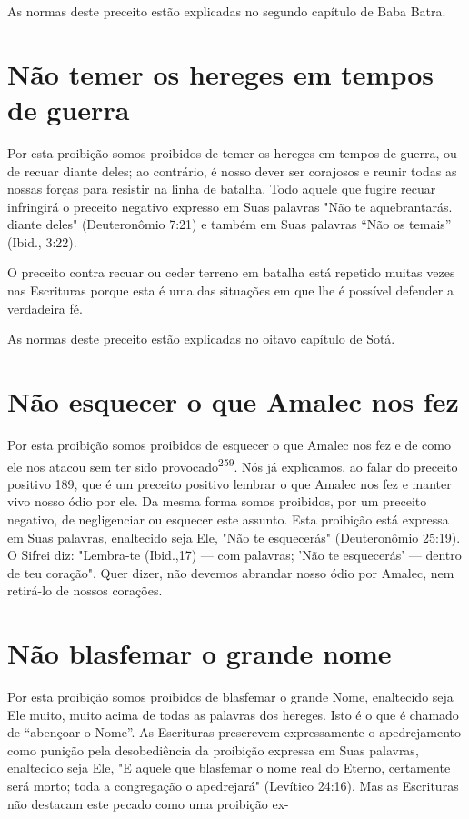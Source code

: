 As normas deste preceito estão explicadas no segundo capítulo de Baba
Batra.

\section{Não temer os hereges em tempos de guerra}

Por esta proibição somos proibidos de temer os hereges em tempos de
guerra, ou de recuar diante deles; ao contrário, é nosso dever ser
corajosos e reunir todas as nossas forças para resistir na linha de
batalha. Todo aquele que fugire recuar infringirá o preceito negativo
expresso em Suas palavras "Não te aquebrantarás. diante deles"
(Deuteronômio 7:21) e também em Suas pala­vras ``Não os temais'' (Ibid.,
3:22).

O preceito contra recuar ou ceder terreno em batalha está repetido
muitas vezes nas Escrituras porque esta é uma das situações em que lhe é
possí­vel defender a verdadeira fé.


As normas deste preceito estão explicadas no oitavo capítulo de Sotá.


\section{Não esquecer o que Amalec nos fez}

Por esta proibição somos proibidos de esquecer o que Amalec nos fez e de
como ele nos atacou sem ter sido provocado\textsuperscript{259}. Nós já
explicamos, ao falar do preceito positivo 189, que é um preceito
positivo lembrar o que Amalec nos fez e manter vivo nosso ódio por ele.
Da mesma forma somos proi­bidos, por um preceito negativo, de
negligenciar ou esquecer este assunto. Es­ta proibição está expressa em
Suas palavras, enaltecido seja Ele, "Não te esque­cerás" (Deuteronômio
25:19). O Sifrei diz: "Lembra-te (Ibid.,17) --- com pala­vras; 'Não te
esquecerás' --- dentro de teu coração". Quer dizer, não devemos abrandar
nosso ódio por Amalec, nem retirá-lo de nossos corações.


\section{Não blasfemar o grande nome}


Por esta proibição somos proibidos de blasfemar o grande Nome,
enaltecido seja Ele muito, muito acima de todas as palavras dos hereges.
Isto é o que é chamado de ``abençoar o Nome''. As Escrituras prescrevem
expressa­mente o apedrejamento como punição pela desobediência da
proibição expressa em Suas palavras, enaltecido seja Ele, "E aquele que
blasfemar o nome real do Eterno, certamente será morto; toda a
congregação o apedrejará" (Levítico 24:16). Mas as Escrituras não
destacam este pecado como uma proibição ex-

